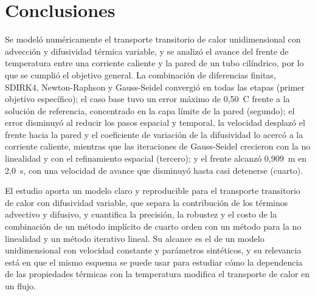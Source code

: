 \documentclass[final,5p,times,twocolumn,authoryear,11pt]{elsarticle}
\begin{document}
\section{Conclusiones}
\label{sec:conclusiones}

Se modeló numéricamente el transporte transitorio de calor unidimensional con advección y difusividad térmica variable, y se analizó el avance del frente de temperatura entre una corriente caliente y la pared de un tubo cilíndrico, por lo que se cumplió el objetivo general. La combinación de diferencias finitas, SDIRK4, Newton-Raphson y Gauss-Seidel convergió en todas las etapas (primer objetivo específico); el caso base tuvo un error máximo de 0,50~\textdegree C frente a la solución de referencia, concentrado en la capa límite de la pared (segundo); el error disminuyó al reducir los pasos espacial y temporal, la velocidad desplazó el frente hacia la pared y el coeficiente de variación de la difusividad lo acercó a la corriente caliente, mientras que las iteraciones de Gauss-Seidel crecieron con la no linealidad y con el refinamiento espacial (tercero); y el frente alcanzó 0,909~m en 2,0~s, con una velocidad de avance que disminuyó hasta casi detenerse (cuarto).

El estudio aporta un modelo claro y reproducible para el transporte transitorio de calor con difusividad variable, que separa la contribución de los términos advectivo y difusivo, y cuantifica la precisión, la robustez y el costo de la combinación de un método implícito de cuarto orden con un método para la no linealidad y un método iterativo lineal. Su alcance es el de un modelo unidimensional con velocidad constante y parámetros sintéticos, y su relevancia está en que el mismo esquema se puede usar para estudiar cómo la dependencia de las propiedades térmicas con la temperatura modifica el transporte de calor en un flujo.

\end{document}
